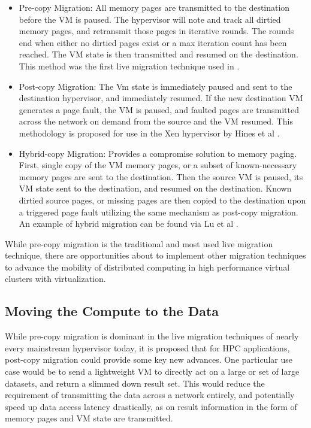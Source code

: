 \begin{itemize}
\item Pre-copy Migration:  All memory pages are transmitted to the destination before the VM is paused. The hypervisor will note and track all dirtied memory pages, and retransmit those pages in iterative rounds. The rounds end when either no dirtied pages exist or a max iteration count has been reached. The VM state is then transmitted and resumed on the destination. This method was the first live migration technique used in \cite{clark2005live}. 
\item Post-copy Migration: The Vm state is immediately paused and sent to the destination hypervisor, and immediately resumed. If the new destination VM generates a page fault, the VM is paused, and faulted pages are transmitted across the network on demand from the source and the VM resumed.  This methodology is proposed for use in the Xen hypervisor by Hines et al \cite{hines2009post}. 
\item Hybrid-copy Migration: Provides a compromise solution to memory paging. First, single copy of the VM memory pages, or a subset of known-necessary memory pages are sent to the destination.  Then the source VM is paused, its VM state sent to the destination, and resumed on the destination.  Known dirtied source pages, or missing pages are then copied to the destination upon a triggered page fault utilizing the same mechanism as post-copy migration. An example of hybrid migration can be found via Lu et al \cite{Lu2013}. 
\end{itemize}

While pre-copy migration is the traditional and most used live migration technique, there are opportunities about to implement other migration techniques to advance the mobility of distributed computing in high performance virtual clusters with virtualization. 

\subsection{Moving the Compute to the Data}


While pre-copy migration is dominant in the live migration techniques of nearly every mainstream hypervisor today, it is proposed that for HPC applications, post-copy migration could provide some key new advances. One particular use case would be to send a lightweight VM to directly act on a large or set of large datasets, and return a slimmed down result set. This would reduce the requirement of transmitting the data across a network entirely, and potentially speed up data access latency drastically, as on result information in the form of memory pages and VM state are transmitted. 

